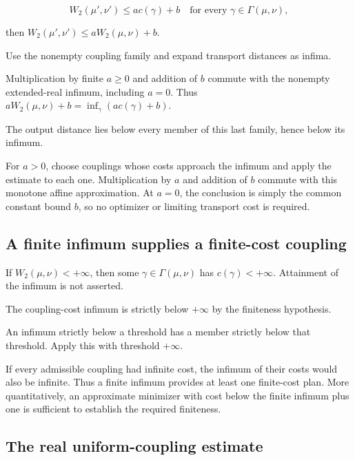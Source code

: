 \documentclass[11pt,a4paper]{report}
\begin{document}
\[W_2(\mu',\nu')\le ac(\gamma)+b\quad\text{for every }\gamma\in\Gamma(\mu,\nu),\]

then \(W_2(\mu',\nu')\le aW_2(\mu,\nu)+b\).



Use the nonempty coupling family and expand transport distances as infima.



Multiplication by finite \(a\ge0\) and addition of \(b\) commute with the nonempty extended-real infimum, including \(a=0\). Thus \(aW_2(\mu,\nu)+b=\inf_\gamma(ac(\gamma)+b)\).



The output distance lies below every member of this last family, hence below its infimum.



For \(a>0\), choose couplings whose costs approach the infimum and apply the estimate to each one. Multiplication by \(a\) and addition of \(b\) commute with this monotone affine approximation. At \(a=0\), the conclusion is simply the common constant bound \(b\), so no optimizer or limiting transport cost is required.

\subsection{\texorpdfstring{A finite infimum supplies a finite-cost coupling}{A finite infimum supplies a finite-cost coupling}}
\label{report-step-UnadjustedLangevin-InitialCoupling-lean-2}


If \(W_2(\mu,\nu)<+\infty\), then some \(\gamma\in\Gamma(\mu,\nu)\) has \(c(\gamma)<+\infty\). Attainment of the infimum is not asserted.



The coupling-cost infimum is strictly below \(+\infty\) by the finiteness hypothesis.



An infimum strictly below a threshold has a member strictly below that threshold. Apply this with threshold \(+\infty\).



If every admissible coupling had infinite cost, the infimum of their costs would also be infinite. Thus a finite infimum provides at least one finite-cost plan. More quantitatively, an approximate minimizer with cost below the finite infimum plus one is sufficient to establish the required finiteness.

\subsection{\texorpdfstring{The real uniform-coupling estimate}{The real uniform-coupling estimate}}
\label{report-step-UnadjustedLangevin-InitialCoupling-lean-3}
\end{document}
